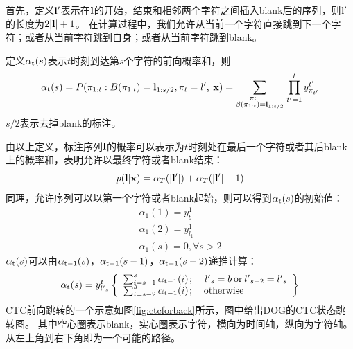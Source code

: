 首先，定义${{\bf{l'}}}$表示在$\bf{l}$的开始，结束和相邻两个字符之间插入blank后的序列，则${{\bf{l'}}}$的长度为$2|{\bf{l}}| + 1$。
在计算过程中，我们允许从当前一个字符直接跳到下一个字符；或者从当前字符跳到自身；或者从当前字符跳到blank。

定义${\alpha _{\rm{t}}}(s)$表示$t$时刻到达第$s$个字符的前向概率和，则
\begin{equation}
{\alpha _{\rm{t}}}(s) = P({\pi _{1:t}}:B({\pi _{1:t}}) = {{\bf{l}}_{1:s/2}},{\pi _t} = {{l'}_s}{\rm{|}}{\bf{x}}{\rm{) = }}\sum\limits_{\scriptstyle{\kern 1pt} {\kern 1pt} {\kern 1pt} {\kern 1pt} {\kern 1pt} {\kern 1pt} {\kern 1pt} {\kern 1pt} {\kern 1pt} {\kern 1pt} {\kern 1pt} {\kern 1pt} {\kern 1pt} {\kern 1pt} \pi :\hfill\atop
\scriptstyle\beta ({\pi _{1:t}}) = {{\bf{l}}_{1:s/2}}\hfill} {\prod\limits_{t' = 1}^t {y_{{\pi _{t'}}}^{t'}} }
\end{equation}
$s/2$表示去掉blank的标注。

由以上定义，标注序列$\bf{l}$的概率可以表示为$t$时刻处在最后一个字符或者其后blank上的概率和，表明允许以最终字符或者blank结束：
\begin{equation}
p({\bf{l}}|{\bf{x}}) = {\alpha _T}(|{\bf{l'}}|) + {\alpha _T}(|{\bf{l'}}| - 1)
\end{equation}
同理，允许序列可以以第一个字符或者blank起始，则可以得到${\alpha _{\rm{t}}}(s)$的初始值：
\begin{equation}
\begin{array}{l}
{\alpha _1}(1) = y_b^1\\
{\alpha _1}(2) = y_{{l_1}}^1\\
{\alpha _1}(s) = 0,\forall s > 2
\end{array}
\end{equation}
${\alpha _{\rm{t}}}(s)$可以由${\alpha _{\rm{t-1}}}(s)$，${\alpha _{\rm{t-1}}}(s-1)$，${\alpha _{\rm{t-1}}}(s-2)$递推计算：
\begin{equation}
\label{equation:alpha}
{\alpha _{\rm{t}}}(s) = y_{{{l'}_s}}^t\left\{ \begin{array}{l}
\sum\nolimits_{i = s - 1}^s {{\alpha _{{\rm{t - 1}}}}(i){\kern 1pt} ;} {\kern 1pt} {\kern 1pt} {\kern 1pt} {\kern 1pt} {\kern 1pt} {\kern 1pt} {\kern 1pt} {\kern 1pt} {\kern 1pt} {\kern 1pt} {\kern 1pt} {\kern 1pt} {\kern 1pt} {{l'}_s} = b{\kern 1pt} {\kern 1pt} {\rm{or}}{\kern 1pt} {\kern 1pt} {{l'}_{s - 2}} = {{l'}_s}\\
\sum\nolimits_{i = s - 2}^s {{\alpha _{{\rm{t - 1}}}}(i){\kern 1pt} ;} {\kern 1pt} {\kern 1pt} {\kern 1pt} {\kern 1pt} {\kern 1pt} {\kern 1pt} {\kern 1pt} {\kern 1pt} {\kern 1pt} {\kern 1pt} {\kern 1pt} {\kern 1pt} {\rm{otherwise}}
\end{array} \right\}
\end{equation}
CTC前向跳转的一个示意如图\ref{fig:ctcforback}所示，图中给出DOG的CTC状态跳转图。
其中空心圈表示blank，实心圈表示字符，横向为时间轴，纵向为字符轴。
从左上角到右下角即为一个可能的路径。



